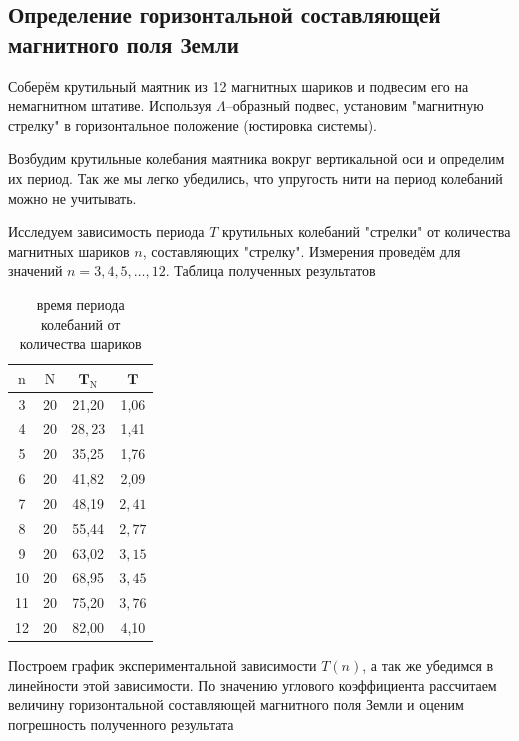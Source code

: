 \documentclass[a4paper, 12pt]{article}%
\begin{document}
\subsection{Определение горизонтальной составляющей магнитного поля Земли}

Соберём крутильный маятник из 12 магнитных шариков и подвесим его на немагнитном штативе. Используя $\Lambda$--образный подвес, установим "магнитную стрелку" в горизонтальное положение (юстировка системы).

Возбудим крутильные колебания маятника вокруг вертикальной оси и определим их период. Так же мы легко убедились, что упругость нити на период колебаний можно не учитывать. 

Исследуем зависимость периода $T$ крутильных колебаний "стрелки" от количества магнитных шариков $n$, составляющих "стрелку". Измерения проведём для значений $n = 3, 4, 5, \dots , 12$. Таблица полученных результатов 

\newpage

\begin{table}[!h]
\begin{center}
\begin{tabular}{|c|c|c|c|}
\hline $\mathrm{n}$ & $\mathrm{N}$ & $\mathbf{T}_{\mathrm{N}}$ & $\boldsymbol{T}$ \\
\hline 3 & 20 & 21,20 & 1,06 \\
\hline 4 & 20 & $28,23$ & 1,41 \\
\hline 5 & 20 & 35,25 & 1,76 \\
\hline 6 & 20 & 41,82 & 2,09 \\
\hline 7 & 20 & 48,19 & $2,41$ \\
\hline 8 & 20 & 55,44 & $2,77$ \\
\hline 9 & 20 & 63,02 & $3,15$ \\
\hline 10 & 20 & 68,95 & $3,45$ \\
\hline 11 & 20 & 75,20 & $3,76$ \\
\hline 12 & 20 & 82,00 & 4,10 \\
\hline
\end{tabular}
\caption{время периода колебаний от количества шариков}
\end{center}
\end{table}

Построем график экспериментальной зависимости $T(n)$, а так же убедимся в линейности этой зависимости. По значению углового коэффициента рассчитаем величину горизонтальной составляющей магнитного поля Земли и оценим погрешность полученного результата
\end{document}
